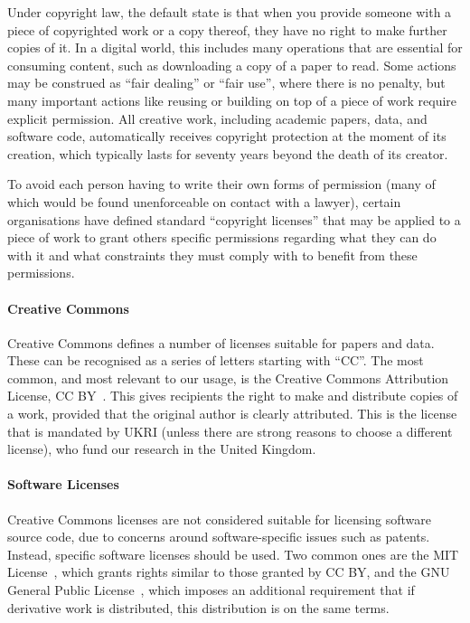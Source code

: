 \documentclass{article}
\begin{document}
Under copyright law,
the default state is that
when you provide someone with a piece of copyrighted work
or a copy thereof,
they have no right to make further copies of it.
In a digital world,
this includes many operations that are essential for consuming content,
such as downloading a copy of a paper to read.
Some actions may be construed as ``fair dealing'' or ``fair use'',
where there is no penalty,
but many important actions
like reusing or building on top of a piece of work
require explicit permission.
All creative work,
including academic papers, data, and software code,
automatically receives copyright protection at the moment of its creation,
which typically lasts for seventy years beyond the death of its creator.

To avoid each person having to write their own forms of permission
(many of which would be found unenforceable on contact with a lawyer),
certain organisations have defined standard ``copyright licenses''
that may be applied to a piece of work
to grant others specific permissions regarding what they can do with it
and what constraints they must comply with to benefit from these permissions.

\paragraph{Creative Commons}

Creative Commons defines a number of licenses suitable for papers and data.
These can be recognised as a series of letters starting with ``CC''.
The most common,
and most relevant to our usage,
is the Creative Commons Attribution License,
CC BY~\cite{cc-by}.
This gives recipients the right to make and distribute copies of a work,
provided that the original author is clearly attributed.
This is the license that is mandated by UKRI
(unless there are strong reasons to choose a different license),
who fund our research in the United Kingdom.

\paragraph{Software Licenses}

Creative Commons licenses are not considered
suitable for licensing software source code,
due to concerns around software-specific issues such as patents.
Instead,
specific software licenses should be used.
Two common ones are the MIT License~\cite{mit},
which grants rights similar to those granted by CC BY,
and the GNU General Public License~\cite{gpl},
which imposes an additional requirement that
if derivative work is distributed,
this distribution is on the same terms.
\end{document}
